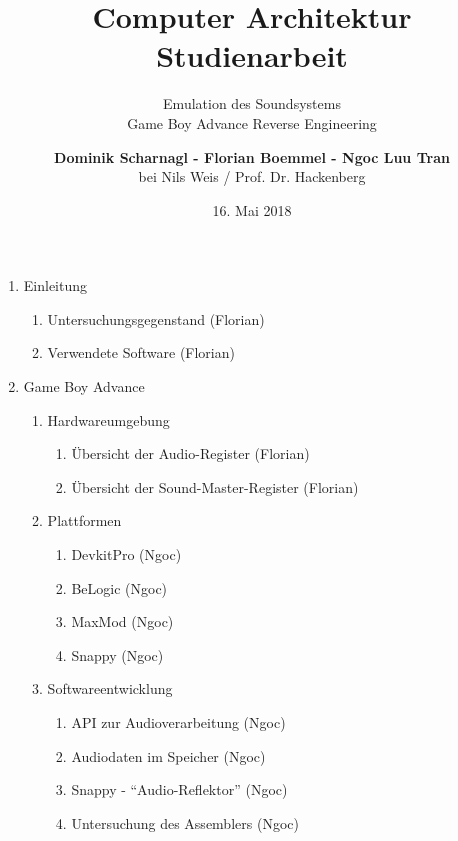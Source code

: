 \documentclass[11pt,a4paper]{scrartcl}
\title{\vspace{5cm}\huge Computer Architektur \\ \Large Studienarbeit \vspace{1cm}}
\subtitle{\Huge Emulation des Soundsystems \\ \Large Game Boy Advance Reverse Engineering \vspace{1cm}}
\author{\large \textbf{Dominik Scharnagl - Florian Boemmel - Ngoc Luu Tran}\\ \normalsize bei Nils Weis / Prof. Dr. Hackenberg}
\date{\normalsize 16. Mai 2018}
\begin{document}
\sffamily

\maketitle
\thispagestyle{empty}
\clearpage

\setcounter{page}{1}


\tableofcontents
\clearpage
{}


\printindex
\clearpage


\begin{enumerate}
    \item Einleitung
    \begin{enumerate}
        \item Untersuchungsgegenstand (Florian)
        \item Verwendete Software (Florian)
    \end{enumerate}
    
    \item Game Boy Advance
    \begin{enumerate}
        \item Hardwareumgebung
        \begin{enumerate}
            \item \"Ubersicht der Audio-Register (Florian)
            \item \"Ubersicht der Sound-Master-Register (Florian)
        \end{enumerate}
        
        \item Plattformen
        \begin{enumerate}
            \item DevkitPro (Ngoc)
            \item BeLogic (Ngoc)
            \item MaxMod (Ngoc)
            \item Snappy (Ngoc)
        \end{enumerate}
        
        \item Softwareentwicklung
        \begin{enumerate}
            \item API zur Audioverarbeitung (Ngoc)
            \item Audiodaten im Speicher (Ngoc)
            \item Snappy - \enquote{Audio-Reflektor} (Ngoc)
            \item Untersuchung des Assemblers (Ngoc)
        \end{enumerate}
    \end{enumerate}
    

\end{enumerate}
\end{document}

